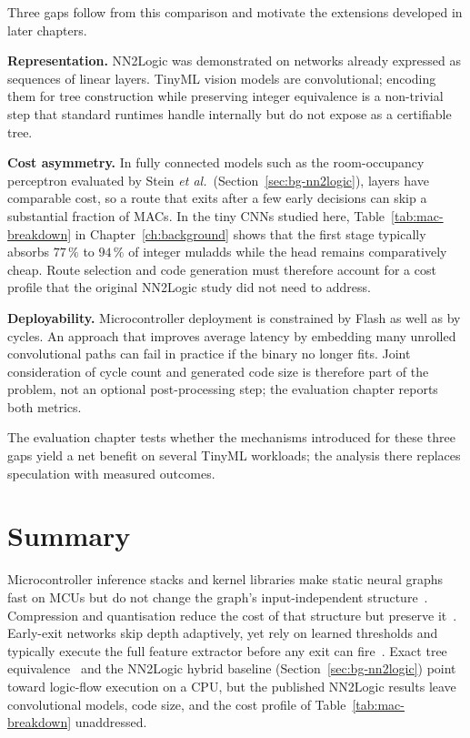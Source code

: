 Three gaps follow from this comparison and motivate the extensions developed in later chapters.

\textbf{Representation.}
NN2Logic was demonstrated on networks already expressed as sequences of linear layers.
TinyML vision models are convolutional; encoding them for tree construction while preserving integer equivalence is a non-trivial step that standard runtimes handle internally but do not expose as a certifiable tree.

\textbf{Cost asymmetry.}
In fully connected models such as the room-occupancy perceptron evaluated by Stein \textit{et al.}\ (Section~\ref{sec:bg-nn2logic}), layers have comparable cost, so a route that exits after a few early decisions can skip a substantial fraction of \acp{MAC}.
In the tiny \acp{CNN} studied here, Table~\ref{tab:mac-breakdown} in Chapter~\ref{ch:background} shows that the first stage typically absorbs \(77\,\%\) to \(94\,\%\) of integer muladds while the head remains comparatively cheap.
Route selection and code generation must therefore account for a cost profile that the original NN2Logic study did not need to address.

\textbf{Deployability.}
Microcontroller deployment is constrained by Flash as well as by cycles.
An approach that improves average latency by embedding many unrolled convolutional paths can fail in practice if the binary no longer fits.
Joint consideration of cycle count and generated code size is therefore part of the problem, not an optional post-processing step; the evaluation chapter reports both metrics.

The evaluation chapter tests whether the mechanisms introduced for these three gaps yield a net benefit on several TinyML workloads; the analysis there replaces speculation with measured outcomes.


\section{Summary}
\label{sec:rw-summary}

Microcontroller inference stacks and kernel libraries make static neural graphs fast on \acp{MCU} but do not change the graph's input-independent structure~\cite{lai2018cmsisnn,david2021tflite,lin2020mcunet}.
Compression and quantisation reduce the cost of that structure but preserve it~\cite{han2015deepcompression,jacob2018quantization,sun2023classquant}.
Early-exit networks skip depth adaptively, yet rely on learned thresholds and typically execute the full feature extractor before any exit can fire~\cite{teerapittayanon2016branchynet,wang2024earlyexit,guo2025dynamic}.
Exact tree equivalence~\cite{aytekin2022nns} and the NN2Logic hybrid baseline (Section~\ref{sec:bg-nn2logic}) point toward logic-flow execution on a \ac{CPU}, but the published NN2Logic results leave convolutional models, code size, and the cost profile of Table~\ref{tab:mac-breakdown} unaddressed.

